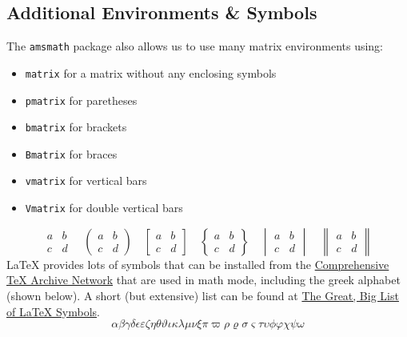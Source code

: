 \documentclass[11pt, twoside]{article}
\begin{document}
\subsection{Additional Environments \& Symbols}
The \lstinline{amsmath} package also allows us to use many matrix environments using:
\begin{itemize}
    \item \lstinline{matrix} for a matrix without any enclosing symbols
    \item \lstinline{pmatrix} for paretheses
    \item \lstinline{bmatrix} for brackets
    \item \lstinline{Bmatrix} for braces
    \item \lstinline{vmatrix} for vertical bars
    \item \lstinline{Vmatrix} for double vertical bars
\end{itemize}
\begin{equation*}
    \begin{matrix}
        a & b \\
        c & d
    \end{matrix}
    \quad
    \begin{pmatrix}
        a & b \\
        c & d
    \end{pmatrix}
    \quad
    \begin{bmatrix}
        a & b \\
        c & d
    \end{bmatrix}
    \quad
    \begin{Bmatrix}
        a & b \\
        c & d
    \end{Bmatrix}
    \quad
    \begin{vmatrix}
        a & b \\
        c & d
    \end{vmatrix}
    \quad
    \begin{Vmatrix}
        a & b \\
        c & d
    \end{Vmatrix}
\end{equation*}
\LaTeX{} provides lots of symbols that can be installed from the \href{https://ctan.org}{Comprehensive TeX Archive Network} that are used in math mode, including the greek alphabet (shown below). A short (but extensive) list can be found at \href{https://www.rpi.edu/dept/arc/training/latex/LaTeX_symbols.pdf}{The Great, Big List of \LaTeX{} Symbols}.
\begin{equation*}
    \alpha \beta \gamma \delta \epsilon \varepsilon \zeta \eta \theta \vartheta \iota \kappa \lambda \mu \nu \xi \pi \varpi \rho \varrho \sigma \varsigma \tau \upsilon \phi \varphi \chi \psi \omega
\end{equation*}
\end{document}
